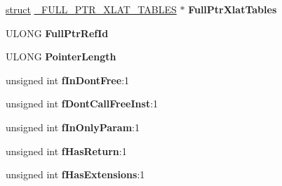 \begin{DoxyCompactItemize}
\item 
\mbox{\label{struct___m_i_d_l___s_t_u_b___m_e_s_s_a_g_e_a87f61d4cf91d3fcca7049912ced89835}} 
\hyperlink{interfacestruct}{struct} \hyperlink{struct___f_u_l_l___p_t_r___x_l_a_t___t_a_b_l_e_s}{\+\_\+\+F\+U\+L\+L\+\_\+\+P\+T\+R\+\_\+\+X\+L\+A\+T\+\_\+\+T\+A\+B\+L\+ES} $\ast$ {\bfseries Full\+Ptr\+Xlat\+Tables}
\item 
\mbox{\label{struct___m_i_d_l___s_t_u_b___m_e_s_s_a_g_e_a70dd8211fdc0d56f3a907d65523ea0ab}} 
U\+L\+O\+NG {\bfseries Full\+Ptr\+Ref\+Id}
\item 
\mbox{\label{struct___m_i_d_l___s_t_u_b___m_e_s_s_a_g_e_a0fad80183b5be6a98ff7df8cf95a94c1}} 
U\+L\+O\+NG {\bfseries Pointer\+Length}
\item 
\mbox{\label{struct___m_i_d_l___s_t_u_b___m_e_s_s_a_g_e_af7778d6235513895e8f2b91c78ca7af9}} 
unsigned int {\bfseries f\+In\+Dont\+Free}\+:1
\item 
\mbox{\label{struct___m_i_d_l___s_t_u_b___m_e_s_s_a_g_e_a557162814603de4cc1dc974e953c1671}} 
unsigned int {\bfseries f\+Dont\+Call\+Free\+Inst}\+:1
\item 
\mbox{\label{struct___m_i_d_l___s_t_u_b___m_e_s_s_a_g_e_a9d4f3fc3a9906da25edf5daf55cf814c}} 
unsigned int {\bfseries f\+In\+Only\+Param}\+:1
\item 
\mbox{\label{struct___m_i_d_l___s_t_u_b___m_e_s_s_a_g_e_a7c86552b1ede4e282359587bd1fd473c}} 
unsigned int {\bfseries f\+Has\+Return}\+:1
\item 
\mbox{\label{struct___m_i_d_l___s_t_u_b___m_e_s_s_a_g_e_a88f87573a188679d8abd8764265fbe34}} 
unsigned int {\bfseries f\+Has\+Extensions}\+:1
\item 
\mbox{\label{struct___m_i_d_l___s_t_u_b___m_e_s_s_a_g_e_ae6e5519bf6cb6f22d65cbda97d7426b3}} 

\end{DoxyCompactItemize}

